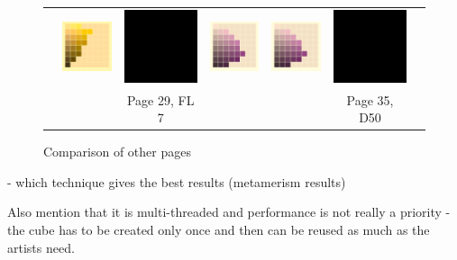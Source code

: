 \begin{figure}[t]
{\begin{tabular}{ccccccc}
			&
			\includegraphics[width=.155\linewidth]{img/results_uplift_page11_ourFL11.png}
			& 
			\includegraphics[width=.155\linewidth]{img/toDelete.png}
			&\quad
			\includegraphics[width=.155\linewidth]{img/results_uplift_page35_originalD50.png}
			&
			\includegraphics[width=.155\linewidth]{img/results_uplift_page35_ourD50.png}
			&
			\includegraphics[width=.155\linewidth]{img/toDelete.png}\\
			& & Page 29, FL 7 & & & Page 35, D50 & \\
		\end{tabular}
	}
	\caption{Comparison of other pages}
	\label{fig:results_uplift_munsell_other}
\end{figure}

- which technique gives the best results (metamerism results)


Also mention that it is multi-threaded and performance is not really a priority - the cube has to be created only once and then can be reused as much as the artists need.

